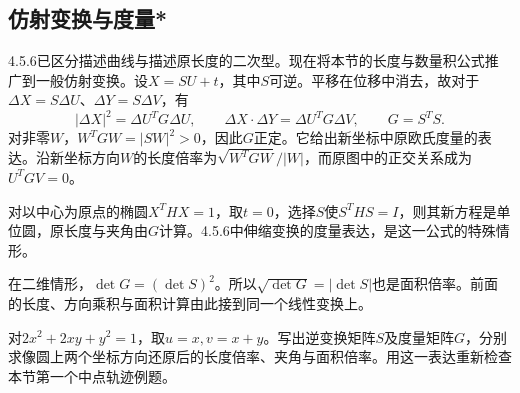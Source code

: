 \newpage
\subsection{仿射变换与度量*}
\label{subsec:quadratic-affine-metric-forms}

4.5.6已区分描述曲线与描述原长度的二次型。现在将本节的长度与数量积公式推广到一般仿射变换。设\(X=SU+t\)，其中\(S\)可逆。平移在位移中消去，故对于\(\Delta X=S\Delta U\)、\(\Delta Y=S\Delta V\)，有
\begin{equation}\label{eq:quadratic-pulled-back-metric}
    |\Delta X|^2=\Delta U^TG\Delta U ,\qquad
    \Delta X\cdot\Delta Y=\Delta U^TG\Delta V ,\qquad G=S^TS .
\end{equation}
对非零\(W\)，\(W^TGW=|SW|^2>0\)，因此\(G\)正定。它给出新坐标中原欧氏度量的表达。沿新坐标方向\(W\)的长度倍率为\(\sqrt{W^TGW}/|W|\)，而原图中的正交关系成为\(U^TGV=0\)。

对以中心为原点的椭圆\(X^THX=1\)，取\(t=0\)，选择\(S\)使\(S^THS=I\)，则其新方程是单位圆，原长度与夹角由\(G\)计算。4.5.6中伸缩变换的度量表达，是这一公式的特殊情形。

在二维情形，\(\det G=(\det S)^2\)。所以\(\sqrt{\det G}=|\det S|\)也是面积倍率。前面的长度、方向乘积与面积计算由此接到同一个线性变换上。

\begin{samepage}
\begin{example}
对\(2x^2+2xy+y^2=1\)，取\(u=x,v=x+y\)。写出逆变换矩阵\(S\)及度量矩阵\(G\)，分别求像圆上两个坐标方向还原后的长度倍率、夹角与面积倍率。用这一表达重新检查本节第一个中点轨迹例题。
\end{example}
\end{samepage}

